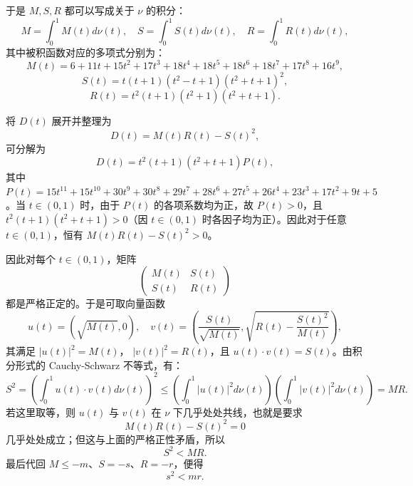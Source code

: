 \begin{solution}
于是 \(M,S,R\) 都可以写成关于 \(\nu\) 的积分：
$$M=\int_{0}^{1}M(t)d\nu(t), \quad S=\int_{0}^{1}S(t)d\nu(t), \quad R=\int_{0}^{1}R(t)d\nu(t),$$
其中被积函数对应的多项式分别为：
$$M(t)=6+11t+15t^{2}+17t^{3}+18t^{4}+18t^{5}+18t^{6}+18t^{7}+17t^{8}+16t^{9},$$
$$S(t)=t(t+1)(t^{2}-t+1)(t^{2}+t+1)^{2},$$
$$R(t)=t^{2}(t+1)(t^{2}+1)(t^{2}+t+1).$$
 
将 \(D(t)\) 展开并整理为
\[
D(t) = M(t)R(t) - S(t)^2,
\]
可分解为
$$D(t)=t^{2}(t+1)(t^{2}+t+1)P(t),$$
其中 $P(t)=15t^{11}+15t^{10}+30t^{9}+30t^{8}+29t^{7}+28t^{6}+27t^{5}+26t^{4}+23t^{3}+17t^{2}+9t+5$。当 $t \in (0,1)$ 时，由于 $P(t)$ 的各项系数均为正，故 $P(t)>0$，且 $t^2(t+1)(t^2+t+1)>0$（因 $t\in(0,1)$ 时各因子均为正）。因此对于任意 $t \in (0,1)$，恒有 $M(t)R(t)-S(t)^2>0$。
 
因此对每个 \(t\in(0,1)\)，矩阵
\[
\begin{pmatrix}M(t)&S(t)\\ S(t)&R(t)\end{pmatrix}
\]
都是严格正定的。于是可取向量函数
$$u(t)=(\sqrt{M(t)},0), \quad v(t)=\left(\frac{S(t)}{\sqrt{M(t)}},\sqrt{R(t)-\frac{S(t)^{2}}{M(t)}}\right),$$
其满足 $|u(t)|^2 = M(t)$， $|v(t)|^2 = R(t)$，且 $u(t) \cdot v(t) = S(t)$。由积分形式的 Cauchy-Schwarz 不等式，有：
$$S^{2}=\left(\int_{0}^{1}u(t)\cdot v(t)d\nu(t)\right)^{2} \le \left(\int_{0}^{1}|u(t)|^{2}d\nu(t)\right)\left(\int_{0}^{1}|v(t)|^{2}d\nu(t)\right)=MR.$$
若这里取等，则 \(u(t)\) 与 \(v(t)\) 在 \(\nu\) 下几乎处处共线，也就是要求
\[
M(t)R(t)-S(t)^2=0
\]
几乎处处成立；但这与上面的严格正性矛盾，所以
\[
S^2 < MR.
\]
最后代回 \(M \le -m\)、\(S=-s\)、\(R=-r\)，便得
\[
s^2 < mr.
\]
\end{solution}

